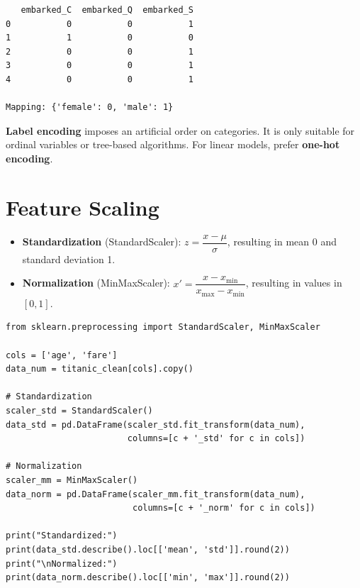\begin{codeoutput}
\begin{verbatim}
   embarked_C  embarked_Q  embarked_S
0           0           0           1
1           1           0           0
2           0           0           1
3           0           0           1
4           0           0           1

Mapping: {'female': 0, 'male': 1}
\end{verbatim}
\end{codeoutput}

\begin{warning}
\textbf{Label encoding} imposes an artificial order on categories. It is only suitable for ordinal variables or tree-based algorithms. For linear models, prefer \textbf{one-hot encoding}.
\end{warning}

\section{Feature Scaling}

\begin{definition}
\begin{itemize}
    \item \textbf{Standardization} (StandardScaler): $z = \dfrac{x - \mu}{\sigma}$, resulting in mean 0 and standard deviation 1.
    \item \textbf{Normalization} (MinMaxScaler): $x' = \dfrac{x - x_{\min}}{x_{\max} - x_{\min}}$, resulting in values in $[0, 1]$.
\end{itemize}
\end{definition}

\begin{codeblock}[title=\textbf{Python}]
\begin{verbatim}
from sklearn.preprocessing import StandardScaler, MinMaxScaler

cols = ['age', 'fare']
data_num = titanic_clean[cols].copy()

# Standardization
scaler_std = StandardScaler()
data_std = pd.DataFrame(scaler_std.fit_transform(data_num),
                        columns=[c + '_std' for c in cols])

# Normalization
scaler_mm = MinMaxScaler()
data_norm = pd.DataFrame(scaler_mm.fit_transform(data_num),
                         columns=[c + '_norm' for c in cols])

print("Standardized:")
print(data_std.describe().loc[['mean', 'std']].round(2))
print("\nNormalized:")
print(data_norm.describe().loc[['min', 'max']].round(2))
\end{verbatim}
\end{codeblock}

